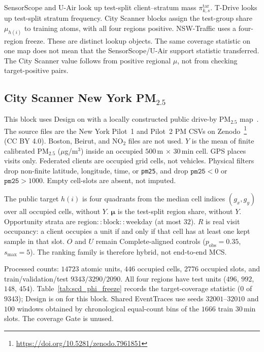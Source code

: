 SensorScope and U-Air look up test-split client--stratum mass
$\pi^{\mathrm{tar}}_{k,s}$.  T-Drive looks up test-split stratum
frequency.  City Scanner blocks assign the test-group share $\mu_{h(i)}$
to training atoms, with all four regions positive.  NSW-Traffic uses a
four-region freeze.  These are distinct lookup objects.  The same
coverage statistic on one map does not mean that the SensorScope/U-Air
support statistic transferred.  The City Scanner value follows from
positive regional $\mu$, not from checking target-positive pairs.

\subsection{City Scanner New York {PM}$_{2.5}$}
\label{app:cityscanner_nyc}

This block uses Design on with a locally constructed
public drive-by
{PM}$_{2.5}$ map~\cite{wang2023cityscanner}.
The source files are the New York Pilot~1 and Pilot~2 {PM} CSVs on
Zenodo~\footnote{\url{https://doi.org/10.5281/zenodo.7961851}}
({CC BY} 4.0).  Boston, Beirut, and {NO}$_2$ files are not used.
$Y$ is the mean of finite calibrated {PM}$_{2.5}$ ($\mu$g/m$^3$) inside
an occupied $500$\,m $\times$ $30$\,min cell.
GPS places visits only.
Federated clients are occupied grid cells, not vehicles.
Physical filters drop non-finite latitude, longitude, time, or
\texttt{pm25}, and drop $\texttt{pm25}<0$ or $\texttt{pm25}>1000$.
Empty cell-slots are absent, not imputed.

The public target $h(i)$ is four quadrants from the median cell indices
$(g_x,g_y)$ over all occupied cells, without $Y$.
$\boldsymbol\mu$ is the test-split region share, without $Y$.
Opportunity strata are $\mathrm{region}{::}\mathrm{block}{::}\mathrm{weekday}$
(at most $32$).
$R$ is real visit occupancy: a client occupies a unit if and only if
that cell has at least one kept sample in that slot.
$O$ and $U$ remain Complete-aligned controls
($p_{\mathrm{obs}}=0.35$, $s_{\max}=5$).
The ranking family is therefore hybrid, not end-to-end MCS.

Processed counts: $14723$ atomic units, $446$ occupied cells, $2776$
occupied slots, and train/validation/test $9343/3290/2090$.
All four regions have test units
($496$, $992$, $148$, $454$).
Table~\ref{tab:scd_phi_freeze} records the target-coverage statistic
($0$ of $9343$); Design is on for this block.
Shared EventTraces use seeds $32001$--$32010$ and $100$ windows obtained
by chronological equal-count bins of the $1666$ train $30$\,min slots.
The coverage Gate is unused.

